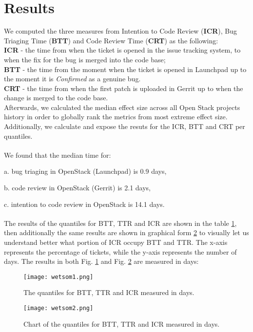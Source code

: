 \documentclass[10pt, conference]{IEEEtran}
\begin{document}
\section{Results}
We computed the three measures from Intention to Code Review (\textbf{ICR}), Bug Triaging Time (\textbf{BTT}) 
and Code Review Time (\textbf{CRT}) as the following: 
\\
\textbf{ICR} - the time from when the ticket is opened in the issue tracking system, to 
when the fix for the bug is merged into the code base;
\\
\textbf{BTT} - the time from the moment when the ticket is opened in
Launchpad up to the moment it is \emph{Confirmed} as a genuine bug.
\\
\textbf{CRT} - the time from when the first patch is uploaded in Gerrit up to when the 
change is merged to the code base.
\\
Afterwards, we calculated the median effect size across all Open Stack projects history 
in order to globally rank the metrics from most extreme effect size.
\\
Additionally, we calculate and expose the resuts for the ICR, BTT and CRT per quantiles.
\\
\\
We found that the median time for: 

a. bug triaging in OpenStack (Launchpad) is 0.9 days,

b. code review in OpenStack (Gerrit) is 2.1 days,

c. intention to code review in OpenStack is 14.1 days. 
\\
\\
The results of the quantiles for BTT, TTR and ICR are shown in the table \ref{fig:1}, then additionally 
the same results are shown in graphical form \ref{fig:2} to visually let us understand better what portion of ICR occupy 
BTT and TTR. The x-axis represents the percentage of tickets, while the y-axis represents the 
number of days. The results in both Fig. \ref{fig:1} and Fig. \ref{fig:2} are measured in days:

\begin{figure}[H]
\centering

\texttt{[image: wetsom1.png]}

\caption{The quantiles for BTT, TTR and ICR measured in days.}
\label{fig:1}
\end{figure}

\begin{figure}[H]
\centering

\texttt{[image: wetsom2.png]}

\caption{Chart of the quantiles for BTT, TTR and ICR measured in days.}
\label{fig:2}
\end{figure}
\end{document}
